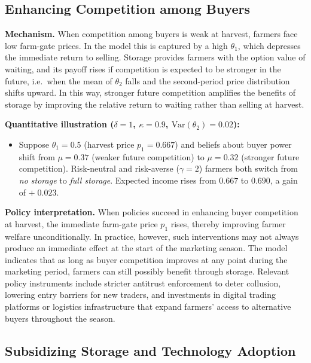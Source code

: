 \subsection{Enhancing Competition among Buyers}

\textbf{Mechanism.} When competition among buyers is weak at harvest, farmers face low farm-gate prices. In the model this is captured by a high $\theta_1$, which depresses the immediate return to selling. Storage provides farmers with the option value of waiting, and its payoff rises if competition is expected to be stronger in the future, i.e.\ when the mean of $\theta_2$ falls and the second-period price distribution shifts upward. In this way, stronger future competition amplifies the benefits of storage by improving the relative return to waiting rather than selling at harvest.

\textbf{Quantitative illustration ($\delta=1$, $\kappa=0.9$, $\text{Var}(\theta_2)=0.02$):}
\begin{itemize}
  \item Suppose $\theta_1=0.5$ (harvest price $p_1=0.667$) and beliefs about buyer power shift from $\mu=0.37$ (weaker future competition) to $\mu=0.32$ (stronger future competition). Risk-neutral and risk-averse ($\gamma=2$) farmers both switch from \emph{no storage} to \emph{full storage}. Expected income rises from $0.667$ to $0.690$, a gain of $+\;0.023$.
\end{itemize}

\textbf{Policy interpretation.} When policies succeed in enhancing buyer competition at harvest, the immediate farm-gate price $p_1$ rises, thereby improving farmer welfare unconditionally. In practice, however, such interventions may not always produce an immediate effect at the start of the marketing season. The model indicates that as long as buyer competition improves at any point during the marketing period, farmers can still possibly benefit through storage. Relevant policy instruments include stricter antitrust enforcement to deter collusion, lowering entry barriers for new traders, and investments in digital trading platforms or logistics infrastructure that expand farmers’ access to alternative buyers throughout the season.






\subsection{Subsidizing Storage and Technology Adoption}

